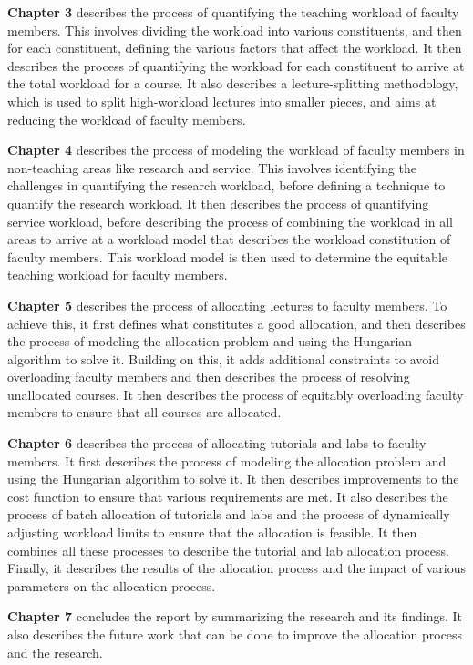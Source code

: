 \textbf{Chapter 3} describes the process of quantifying the teaching workload of faculty members. This involves dividing the workload into various constituents, and then for each constituent, defining the various factors that affect the workload. It then describes the process of quantifying the workload for each constituent to arrive at the total workload for a course. It also describes a lecture-splitting methodology, which is used to split high-workload lectures into smaller pieces, and aims at reducing the workload of faculty members.

\textbf{Chapter 4} describes the process of modeling the workload of faculty members in non-teaching areas like research and service. This involves identifying the challenges in quantifying the research workload, before defining a technique to quantify the research workload. It then describes the process of quantifying service workload, before describing the process of combining the workload in all areas to arrive at a workload model that describes the workload constitution of faculty members. This workload model is then used to determine the equitable teaching workload for faculty members.

\textbf{Chapter 5} describes the process of allocating lectures to faculty members. To achieve this, it first defines what constitutes a good allocation, and then describes the process of modeling the allocation problem and using the Hungarian algorithm to solve it. Building on this, it adds additional constraints to avoid overloading faculty members and then describes the process of resolving unallocated courses. It then describes the process of equitably overloading faculty members to ensure that all courses are allocated.

\textbf{Chapter 6} describes the process of allocating tutorials and labs to faculty members. It first describes the process of modeling the allocation problem and using the Hungarian algorithm to solve it. It then describes improvements to the cost function to ensure that various requirements are met. It also describes the process of batch allocation of tutorials and labs and the process of dynamically adjusting workload limits to ensure that the allocation is feasible. It then combines all these processes to describe the tutorial and lab allocation process. Finally, it describes the results of the allocation process and the impact of various parameters on the allocation process.

\textbf{Chapter 7} concludes the report by summarizing the research and its findings. It also describes the future work that can be done to improve the allocation process and the research.
